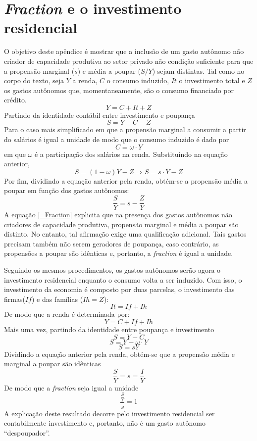   \titleformat{\chapter}{\normalfont\huge}{\appendixname{} \thechapter}{20pt}{\bfseries\huge}

\chapter{\textit{Fraction} e o investimento residencial}
\label{Append_Fraction}

O objetivo deste apêndice é mostrar que a inclusão de um gasto autônomo não criador de capacidade produtiva ao setor privado não condição suficiente para que a propensão marginal ($s$) e média a poupar ($S/Y$) sejam distintas. Tal como no corpo do texto, seja $Y$ a renda, $C$ o consumo induzido, $It$ o investimento total e $Z$ os gastos autônomos que, momentaneamente, são o consumo financiado por crédito. 
$$
Y = C + It + Z
$$
Partindo da identidade contábil entre investimento e poupança
$$
S = Y - C - Z
$$
Para o caso mais simplificado em que a propensão marginal a consumir a partir do salários é igual a unidade de modo que o consumo induzido é dado por
$$
C = \omega\cdot Y
$$
em que $\omega$ é a participação dos salários na renda. Substituindo na equação anterior,
$$
S = (1-\omega)Y - Z \Rightarrow S = s\cdot Y - Z
$$
Por fim, dividindo a equação anterior pela renda, obtém-se a propensão média a poupar em função dos gastos autônomos:
\begin{equation}
\label{_Fraction}
    \frac{S}{Y} = s - \frac{Z}{Y}
\end{equation}
A equação \ref{_Fraction} explicita que na presença dos gastos autônomos não criadores de capacidade produtiva, propensão marginal e média a poupar são distinto. No entanto, tal afirmação exige uma qualificação adicional. Tais gastos precisam também não serem geradores de poupança, caso contrário, as propensões a poupar são idênticas e, portanto, a \textit{fraction} é igual a unidade.

Seguindo os mesmos procedimentos, os gastos autônomos serão agora o investimento residencial enquanto o consumo volta a ser induzido. Com isso, o investimento da economia é composto por duas parcelas, o investimento das firmas($If$) e das famílias ($Ih = Z$):
$$
It = If + Ih
$$
De modo que a renda é determinada por:
$$
Y = C + If + Ih
$$
Mais uma vez, partindo da identidade entre poupança e investimento
$$
S = Y - C
$$
$$
S = Y - \omega\cdot Y
$$
$$
S = sY
$$
Dividindo a equação anterior pela renda, obtém-se que a propensão média e marginal a poupar são idênticas
$$
\frac{S}{Y} = s = \frac{I}{Y}
$$
De modo que a \textit{fraction} seja igual a unidade
$$
\frac{\frac{S}{Y}}{s} = 1
$$
A explicação deste resultado decorre pelo investimento residencial ser contabilmente investimento e, portanto, não é um gasto autônomo ``despoupador''. 

